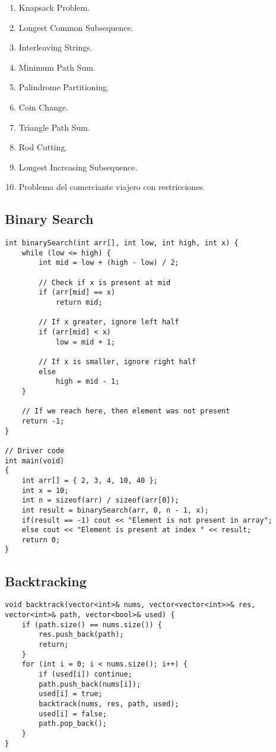 \begin{enumerate} 
  \item Knapsack Problem.

  \item Longest Common Subsequence.

  \item Interleaving Strings.

  \item Minimum Path Sum.

  \item Palindrome Partitioning.

  \item Coin Change.

  \item Triangle Path Sum.

  \item Rod Cutting.

  \item Longest Increasing Subsequence.

  \item Problema del comerciante viajero con restricciones. 
\end{enumerate}

\subsection{Binary Search}

\begin{lstlisting}
int binarySearch(int arr[], int low, int high, int x) {
    while (low <= high) {
        int mid = low + (high - low) / 2;

        // Check if x is present at mid
        if (arr[mid] == x)
            return mid;

        // If x greater, ignore left half
        if (arr[mid] < x)
            low = mid + 1;

        // If x is smaller, ignore right half
        else
            high = mid - 1;
    }

    // If we reach here, then element was not present
    return -1;
}

// Driver code
int main(void)
{
    int arr[] = { 2, 3, 4, 10, 40 };
    int x = 10;
    int n = sizeof(arr) / sizeof(arr[0]);
    int result = binarySearch(arr, 0, n - 1, x);
    if(result == -1) cout << "Element is not present in array";
    else cout << "Element is present at index " << result;
    return 0;
}
\end{lstlisting}
\subsection{Backtracking}

\begin{lstlisting}
void backtrack(vector<int>& nums, vector<vector<int>>& res, vector<int>& path, vector<bool>& used) {
    if (path.size() == nums.size()) {
        res.push_back(path);
        return;
    }
    for (int i = 0; i < nums.size(); i++) {
        if (used[i]) continue;
        path.push_back(nums[i]);
        used[i] = true;
        backtrack(nums, res, path, used);
        used[i] = false;
        path.pop_back();
    }
}
\end{lstlisting}


